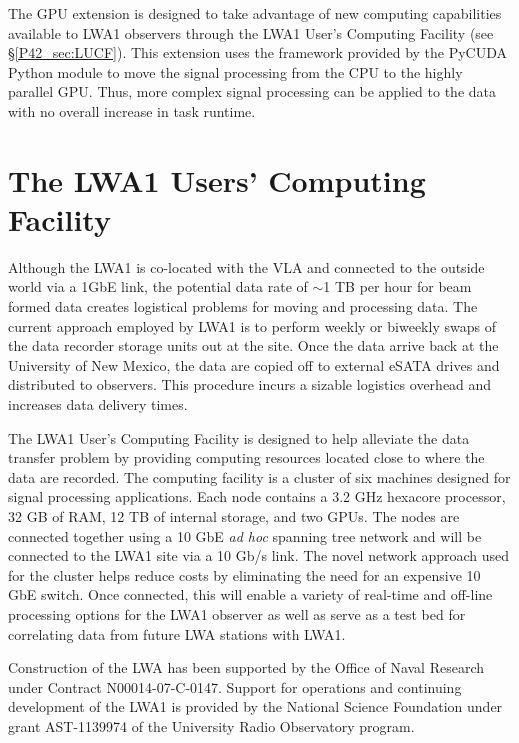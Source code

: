 The GPU extension is designed to take advantage of new computing capabilities available to LWA1 observers through the LWA1 User's Computing Facility (see \S\ref{P42_sec:LUCF}).  This extension uses the framework provided by the PyCUDA \citep{PyCUDA} Python module to move the signal processing from the CPU to the highly parallel GPU.  Thus, more complex signal processing can be applied to the data with no overall increase in task runtime.

\section{\label{P42_sec:LUCF}The LWA1 Users' Computing Facility}
Although the LWA1 is co-located with the VLA and connected to the outside world via a 1GbE link, the potential data rate of $\sim$1 TB per hour for beam formed data creates logistical problems for moving and processing data.  The current approach employed by LWA1 is to perform weekly or biweekly swaps of the data recorder storage units out at the site.  Once the data arrive back at the University of New Mexico, the data are copied off to external eSATA drives and distributed to observers.  This procedure incurs a sizable logistics overhead and increases data delivery times.

The LWA1 User's Computing Facility is designed to help alleviate the data transfer problem by providing computing resources located close to where the data are recorded.  The computing facility is a cluster of  six machines designed for signal processing applications.  Each node contains a 3.2 GHz hexacore processor, 32 GB of RAM, 12 TB of internal storage, and two GPUs.  The nodes are connected together using a 10 GbE {\it ad hoc} spanning tree network and will be connected to the LWA1 site via a 10 Gb/s link.  The novel network approach used for the cluster helps reduce costs by eliminating the need for an expensive 10 GbE switch.  Once connected, this will enable a variety of real-time and off-line processing options for the LWA1 observer as well as serve as a test bed for correlating data from future LWA stations with LWA1.

\acknowledgments Construction of the LWA has been supported by the Office of Naval Research under Contract N00014-07-C-0147.  Support for operations and continuing development of the LWA1 is provided by the National Science Foundation under grant AST-1139974 of the University Radio Observatory program.


